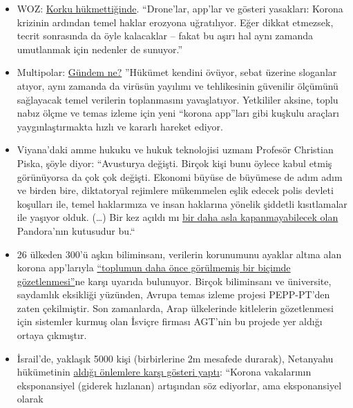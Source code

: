 \begin{itemize}
\tightlist
\item
  WOZ:
  \href{https://www.woz.ch/2016/grundrechte/wenn-die-angst-regiert}{Korku
  hükmettiğinde}. ``Drone'lar, app'lar ve gösteri yasakları: Korona
  krizinin ardından temel haklar erozyona uğratılıyor. Eğer dikkat
  etmezsek, tecrit sonrasında da öyle kalacaklar -- fakat bu aşırı hal
  aynı zamanda umutlanmak için nedenler de sunuyor.''
\item
  Multipolar:
  \href{https://multipolar-magazin.de/artikel/die-massnahmen-wirken}{Gündem
  ne?} ''Hükümet kendini övüyor, sebat üzerine sloganlar atıyor, aynı
  zamanda da virüsün yayılımı ve tehlikesinin güvenilir ölçümünü
  sağlayacak temel verilerin toplanmasını yavaşlatıyor. Yetkililer
  aksine, toplu nabız ölçme ve temas izleme için yeni ``korona app''ları
  gibi kuşkulu araçları yaygınlaştırmakta hızlı ve kararlı hareket
  ediyor.
\item
  Viyana'daki amme hukuku ve hukuk teknolojisi uzmanı Profesör Christian
  Piska, şöyle diyor: ``Avusturya değişti. Birçok kişi bunu öylece kabul
  etmiş görünüyorsa da çok çok değişti. Ekonomi büyüse de büyümese de
  adım adım ve birden bire, diktatoryal rejimlere mükemmelen eşlik
  edecek polis devleti koşulları ile, temel haklarımıza ve insan
  haklarına yönelik şiddetli kısıtlamalar ile yaşıyor olduk. (\ldots{})
  Bir kez açıldı mı
  \href{https://kurier.at/meinung/das-juristische-totschlagargument-vom-menschenleben/400814570}{bir
  daha asla kapanmayabilecek olan} Pandora'nın kutusudur bu.``
\item
  26 ülkeden 300'ü aşkın biliminsanı, verilerin korunumunu ayaklar
  altına alan korona app'larıyla
  \href{https://www.golem.de/news/corona-app-300-wissenschaftler-warnen-vor-zentraler-datenspeicherung-2004-147973.html}{``toplumun
  daha önce görülmemiş bir biçimde gözetlenmesi''}ne karşı uyarıda
  bulunuyor. Birçok biliminsanı ve üniversite, saydamlık eksikliği
  yüzünden, Avrupa temas izleme projesi PEPP-PT'den zaten çekilmiştir.
  Son zamanlarda, Arap ülkelerinde kitlelerin gözetlenmesi için
  sistemler kurmuş olan İsviçre firması AGT'nin bu projede yer aldığı
  ortaya çıkmıştır.
\item
  İsrail'de, yaklaşık 5000 kişi (birbirlerine 2m mesafede durarak),
  Netanyahu hükümetinin
  \href{https://edition.cnn.com/2020/04/20/middleeast/israel-protest-social-distancing-intl/index.html}{aldığı
  önlemlere karşı gösteri yaptı}: ``Korona vakalarının eksponansiyel
  (giderek hızlanan) artışından söz ediyorlar, ama eksponansiyel olarak

\end{itemize}
